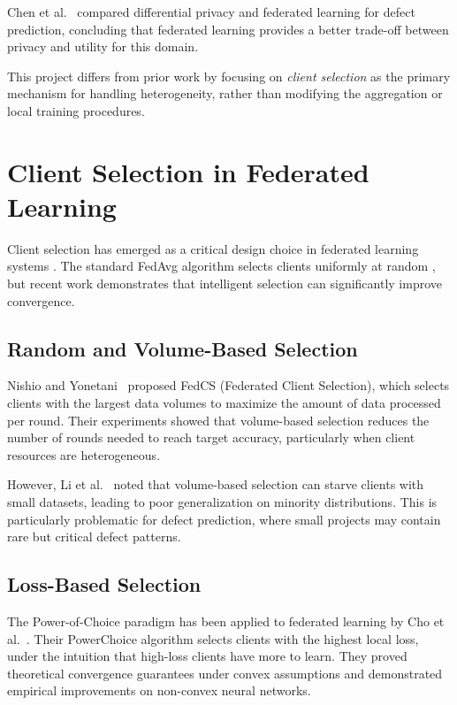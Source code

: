 Chen et al.~\citep{chen2023privacy} compared differential privacy and federated learning for defect prediction, concluding that federated learning provides a better trade-off between privacy and utility for this domain.

This project differs from prior work by focusing on \emph{client selection} as the primary mechanism for handling heterogeneity, rather than modifying the aggregation or local training procedures.

\section{Client Selection in Federated Learning}

Client selection has emerged as a critical design choice in federated learning systems \citep{li2020federated}. The standard FedAvg algorithm selects clients uniformly at random \citep{mcmahan2017communication}, but recent work demonstrates that intelligent selection can significantly improve convergence.

\subsection{Random and Volume-Based Selection}

Nishio and Yonetani~\citep{nishio2019client} proposed FedCS (Federated Client Selection), which selects clients with the largest data volumes to maximize the amount of data processed per round. Their experiments showed that volume-based selection reduces the number of rounds needed to reach target accuracy, particularly when client resources are heterogeneous.

However, Li et al.~\citep{li2020federated} noted that volume-based selection can starve clients with small datasets, leading to poor generalization on minority distributions. This is particularly problematic for defect prediction, where small projects may contain rare but critical defect patterns.

\subsection{Loss-Based Selection}

The Power-of-Choice paradigm \citep{mitzenmacher2001power} has been applied to federated learning by Cho et al.~\citep{cho2020power}. Their PowerChoice algorithm selects clients with the highest local loss, under the intuition that high-loss clients have more to learn. They proved theoretical convergence guarantees under convex assumptions and demonstrated empirical improvements on non-convex neural networks.

